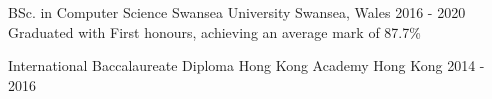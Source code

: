 

\begin{cventries}

  \cventry
    {BSc. in Computer Science} %
    {Swansea University} %
    {Swansea, Wales} %
    {2016 - 2020} %
    {Graduated with First honours, achieving an average mark of 87.7\%}
    
   \cventry
     {International Baccalaureate Diploma}
     {Hong Kong Academy}
     {Hong Kong}
     {2014 - 2016}
     {}
\vspace{-0.4cm}
\end{cventries}
